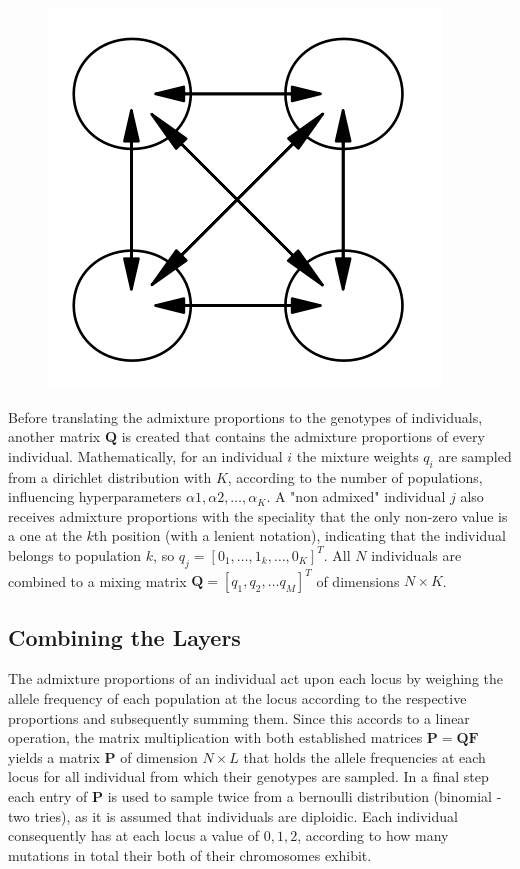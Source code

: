 \documentclass[a4paper, 11pt]{article}
\begin{document}
\begin{figure}
\includegraphics[scale=0.5]{level_2}
\end{figure}

Before translating the admixture proportions to the genotypes of individuals, another matrix  $\mathbf{Q}$ is created that contains the admixture proportions of every individual. Mathematically, for an individual $i$ the mixture weights $q_i$ are sampled from a dirichlet distribution with $K$, according to the number of populations, influencing hyperparameters $\alpha1, \alpha2, \ldots,  \alpha_K$. A "non admixed" individual $j$ also receives admixture proportions with the speciality that the only non-zero value is a one at the $k$th position (with a lenient notation), indicating that the individual belongs to population $k$, so $q_j = [0_1, \ldots, 1_k, \ldots, 0_K]^T$. All $N$ individuals are combined to a mixing matrix $\mathbf{Q} = [q_1,q_2, \ldots q_M]^T$ of dimensions $N \times K$. \\

\subsection{Combining the Layers}

The admixture proportions of an individual act upon each locus by weighing the allele frequency of each population at the locus according to the respective proportions and subsequently summing them. Since this accords to a linear operation, the matrix multiplication with both established matrices $\mathbf{P} = \mathbf{Q}\mathbf{F}$ yields a matrix $\mathbf{P}$ of dimension $N \times L$ that holds the allele frequencies at each locus for all individual from which their genotypes are sampled. In a final step each entry of $\mathbf{P}$ is used to sample twice from a bernoulli distribution (binomial - two tries), as it is assumed that individuals are diploidic. Each individual consequently has at each locus a value of $0, 1, 2$, according to how many mutations in total their both of their chromosomes exhibit.\\
\end{document}
